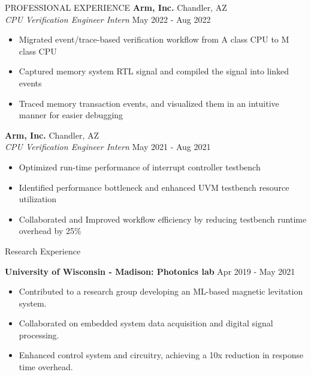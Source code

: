 \documentclass{resume} %
\newcommand{\myitemsep}{\itemsep -0.6em}
\begin{document}
\begin{rSection}{PROFESSIONAL EXPERIENCE}
    \textbf{Arm, Inc.}                          \hfill Chandler, AZ         \\
    \emph{CPU Verification Engineer Intern}     \hfill May 2022 - Aug 2022  \\
    \LineShrinkBeforeItem
    \begin{itemize} [leftmargin=1em]
      \myitemsep
      \item Migrated event/trace-based verification workflow from A class CPU to M class CPU
      \item Captured memory system RTL signal and compiled the signal into linked events
      \item Traced memory transaction events, and visualized them in an intuitive manner for easier debugging
    \end{itemize}

    \textbf{Arm, Inc.}                          \hfill Chandler, AZ         \\
    \emph{CPU Verification Engineer Intern}     \hfill May 2021 - Aug 2021  \\
    \LineShrinkBeforeItem
    \begin{itemize} [leftmargin=1em]
      \myitemsep
      \item Optimized run-time performance of interrupt controller testbench
      \item Identified performance bottleneck and enhanced UVM testbench resource utilization
      \item Collaborated and Improved workflow efficiency by reducing testbench runtime overhead by 25\%
    \end{itemize}

  \end{rSection}


  \begin{rSection}{Research Experience}

    \textbf{University of Wisconsin - Madison: Photonics lab}   \hfill Apr 2019 - May 2021 \\
    \LineShrinkBeforeItem
    \begin{itemize} [leftmargin=1em]
      \myitemsep
      \item Contributed to a research group developing an ML-based magnetic levitation system.
      \item Collaborated on embedded system data acquisition and digital signal processing.
      \item Enhanced control system and circuitry, achieving a 10x reduction in response time overhead.
    \end{itemize}

  \end{rSection}
\end{document}
